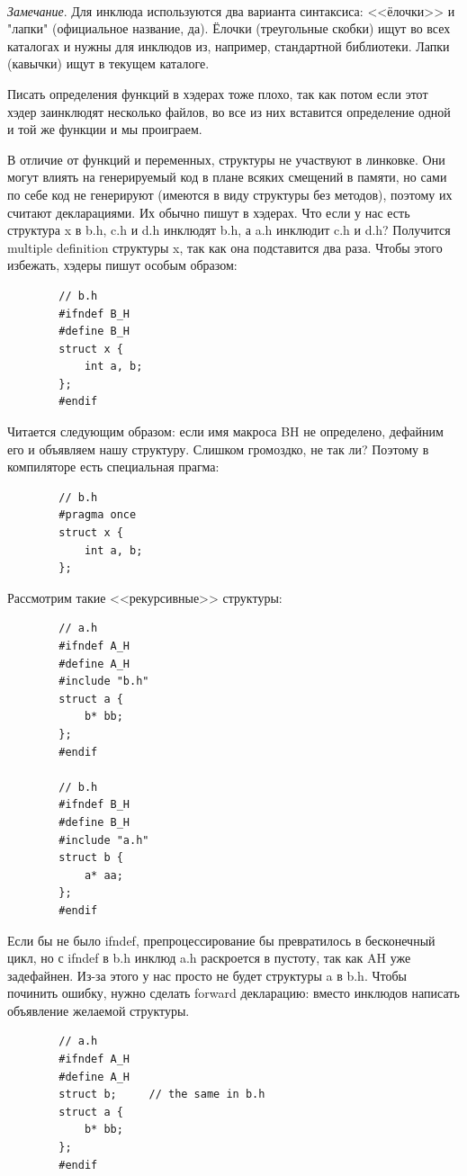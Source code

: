 \documentclass[12pt, a4paper]{article}
\begin{document}
	\\\textit{Замечание}. Для инклюда используются два варианта синтаксиса: <<ёлочки>> и "лапки" (официальное название, да). Ёлочки (треугольные скобки) ищут во всех каталогах и нужны для инклюдов из, например, стандартной библиотеки. Лапки (кавычки) ищут в текущем каталоге.
	\par Писать определения функций в хэдерах тоже плохо, так как потом если этот хэдер заинклюдят несколько файлов, во все из них вставится определение одной и той же функции и мы проиграем.
	\\\par В отличие от функций и переменных, структуры не участвуют в линковке. Они могут влиять на генерируемый код в плане всяких смещений в памяти, но сами по себе код не генерируют (имеются в виду структуры без методов), поэтому их считают декларациями. Их обычно пишут в хэдерах. Что если у нас есть структура x в b.h, c.h и d.h инклюдят b.h, а a.h инклюдит c.h и d.h? Получится multiple definition структуры x, так как она подставится два раза. Чтобы этого избежать, хэдеры пишут особым образом:
	\begin{verbatim}
		// b.h
		#ifndef B_H
		#define B_H
		struct x {
			int a, b;
		};
		#endif
	\end{verbatim}
	Читается следующим образом: если имя макроса B\textunderscore H не определено, дефайним его и объявляем нашу структуру. Слишком громоздко, не так ли? Поэтому в компиляторе есть специальная прагма:
	\begin{verbatim}
		// b.h
		#pragma once
		struct x {
			int a, b;
		};
	\end{verbatim}
	\par Рассмотрим такие <<рекурсивные>> структуры:
	\begin{verbatim}
		// a.h
		#ifndef A_H
		#define A_H
		#include "b.h"
		struct a {
			b* bb;
		};
		#endif
		
		// b.h
		#ifndef B_H
		#define B_H
		#include "a.h"
		struct b {
			a* aa;
		};
		#endif
	\end{verbatim}
	Если бы не было ifndef, препроцессирование бы превратилось в бесконечный цикл, но с ifndef в b.h инклюд a.h раскроется в пустоту, так как A\textunderscore H уже задефайнен. Из-за этого у нас просто не будет структуры a в b.h. Чтобы починить ошибку, нужно сделать forward декларацию: вместо инклюдов написать объявление желаемой структуры.
	\begin{verbatim}
		// a.h
		#ifndef A_H
		#define A_H
		struct b;     // the same in b.h
		struct a {
			b* bb;
		};
		#endif
	\end{verbatim}
\end{document}
